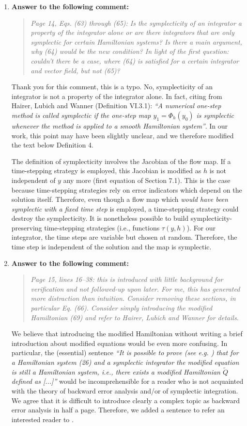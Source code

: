 \documentclass[10pt]{article}
\begin{document}
\begin{enumerate}
\item \textbf{Answer to the following comment:}
\begin{quote} \textit{Page 14, Eqs. (63) through (65): Is the symplecticity of an integrator a property of the integrator alone or are there integrators that are only symplectic for certain Hamiltonian systems? Is there a main argument, why (64) would be the new condition? In light of the first question: couldn’t	there be a case, where (64) is satisfied for a certain integrator and vector field, but not (65)?} \end{quote}
Thank you for this comment, this is a typo. No, symplecticity of an integrator is not a property of the integrator alone. In fact, citing from Hairer, Lubich and Wanner (Definition VI.3.1): \textit{``A numerical one-step method is called symplectic if the one-step map $y_1 = \Phi_h(y_0)$ is symplectic whenever the method is applied to a smooth Hamiltonian system''}. In our work, this point may have been slightly unclear, and we therefore modified the text below Definition 4. 

The definition of symplecticity involves the Jacobian of the flow map. If a time-stepping strategy is employed, this Jacobian is modified as $h$ is not independent of $y$ any more (first equation of Section 7.1). This is the case because time-stepping strategies rely on error indicators which depend on the solution itself. Therefore, even though a flow map which \textit{would have been symplectic with a fixed time step} is employed, a time-stepping strategy could destroy the symplecticity. It is nonetheless possible to build symplecticity-preserving time-stepping strategies (i.e., functions $\tau(y, h)$). For our integrator, the time steps are variable but chosen at random. Therefore, the time step is independent of the solution and the map is symplectic.

\item \textbf{Answer to the following comment:}
\begin{quote} \textit{Page 15, lines 16–38: this is introduced with little background for verification and not followed-up upon later. For me, this has generated more distraction than intuition. Consider removing these sections, in particular Eq. (66). Consider simply introducing the modified Hamiltonian (69) and refer to Hairer, Lubich and Wanner for details.} \end{quote}
We believe that introducing the modified Hamiltonian without writing a brief introduction about modified equations would be even more confusing. In particular, the (essential) sentence \textit{``It is possible to prove (see e.g. \cite[Section IX.8]{HLW06}) that for a Hamiltonian system (26) and a symplectic integrator the modified equation is still a Hamiltonian system, i.e., there exists a modified Hamiltonian $\tilde Q$ defined as [...]''} would be incomprehensible for a reader who is not acquainted with the theory of backward error analysis and/or of symplectic integration. We agree that it is difficult to introduce clearly a complex topic as backward error analysis in half a page. Therefore, we added a sentence to refer an interested reader to \cite[Chapter IX]{HLW06}.


\end{enumerate}
\end{document}

